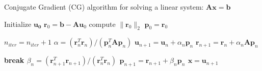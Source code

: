 \documentclass{article}
\begin{document}
\begin{algorithm} 
    \caption{Conjugate Gradient (CG) algorithm 
    for solving a linear system: $\mathbf{Ax=b}$}
    \label{alg1}
    \begin{algorithmic}
        \STATE Initialize $\mathbf{u_0}$
        \STATE $\mathbf{r}_0 = \mathbf{b} - \mathbf{A} \mathbf{u}_0$
        \STATE compute $\|\mathbf{r}_0\|_2$
        \STATE $\mathbf{p}_0 = \mathbf{r}_0$
        
                \STATE $n_{iter} = n_{iter}+1$
                \STATE $\alpha = (\mathbf{r}_n^T \mathbf{r}_n)
                /(\mathbf{p}_n^T \mathbf{A} \mathbf{p}_n)$
                \STATE $\mathbf{u}_{n+1}  
                = \mathbf{u}_n + \alpha_n \mathbf{p}_n$
                \STATE $\mathbf{r}_{n+1}  
                = \mathbf{r}_n + \alpha_n \mathbf{A} \mathbf{p}_n$
                            
                        \STATE \bf{break}
                \ENDIF
                \STATE $\beta_n 
                = (\mathbf{r}_{n+1}^T \mathbf{r}_{n+1})
                /(\mathbf{r}_n^T \mathbf{r}_n)$
                \STATE $\mathbf{p}_{n+1} 
                = \mathbf{r}_{n+1} + \beta_n \mathbf{p}_n $
        \ENDWHILE
        \STATE $\mathbf{x} = \mathbf{u}_{n+1}$
    \end{algorithmic}
\end{algorithm}
\end{document}
